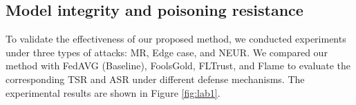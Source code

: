 \documentclass[lettersize,journal]{IEEEtran}
\begin{document}
\subsection{Model integrity and poisoning resistance}
To validate the effectiveness of our proposed method, we conducted experiments under three types of attacks: MR, Edge case, and NEUR. We compared our method with FedAVG (Baseline), FoolsGold, FLTrust, and Flame to evaluate the corresponding TSR and ASR under different defense mechanisms. The experimental results are shown in Figure \ref{fig:lab1}.
\end{document}
